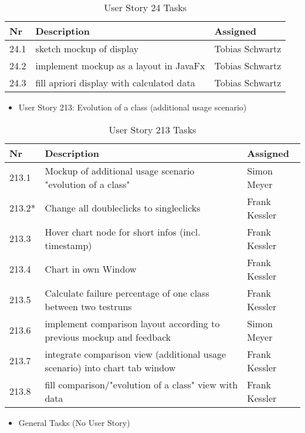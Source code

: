 \begin{table}[h]
  \caption{User Story 24 Tasks}
  \label{Story 24 Tasks}
  \centering
  \begin{tabular}{p{1cm}|p{5cm}|p{3cm}|}
  	Nr & Description & Assigned \\ 
  	\hline
  	24.1 & sketch mockup of display & Tobias Schwartz \\ 
  	\hline
  	24.2 & implement mockup as a layout in JavaFx & Tobias Schwartz \\ 
  	\hline
  	24.3 & fill apriori display with calculated data & Tobias Schwartz \\ 
  	\hline
  \end{tabular}
\end{table}

\begin{itemize}
	\item User Story 213: Evolution of a class (additional usage scenario)
	\end{itemize}

\begin{table}[h]
  \caption{User Story 213 Tasks}
  \label{Story 213 Tasks}
  \centering
  \begin{tabular}{p{1cm}|p{5cm}|p{3cm}|}
  	Nr & Description & Assigned \\ 
  	\hline
  	213.1 & Mockup of additional usage scenario "evolution of a class" & Simon Meyer \\ 
  	\hline
  	213.2* & Change all doubleclicks to singleclicks & Frank Kessler \\ 
  	\hline
  	213.3 & Hover chart node for short infos (incl. timestamp) & Frank Kessler \\ 
  	\hline
  	213.4 & Chart in own Window & Frank Kessler \\ 
  	\hline
  	213.5 & Calculate failure percentage of one class between two testruns & Frank Kessler \\ 
  	\hline
  	213.6 & implement comparison layout according to previous mockup and feedback & Simon Meyer \\ 
  	\hline
  	213.7 & integrate comparison view (additional usage scenario) into chart tab window & Frank Kessler \\ 
  	\hline
  	213.8 & fill comparison/"evolution of a class" view with data & Frank Kessler \\ 
  	\hline
  \end{tabular}
\end{table}

\begin{itemize}
	\item General Tasks (No User Story)
	\end{itemize}


